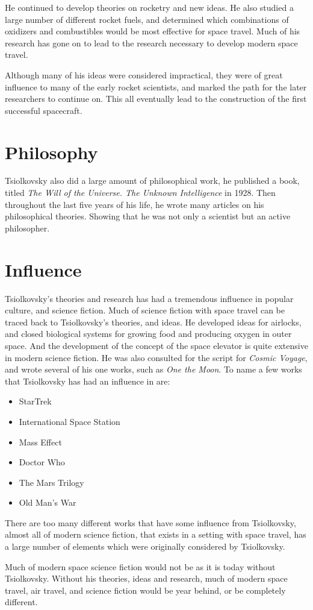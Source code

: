\documentclass[10pt]{armath}
\begin{document}
He continued to develop theories on rocketry and new ideas. He also studied a
large number of different rocket fuels, and determined which combinations of
oxidizers and combustibles would be most effective for space travel. Much of
his research has gone on to lead to the research necessary to develop modern
space travel.

Although many of his ideas were considered impractical, they were of great
influence to many of the early rocket scientists, and marked the path for the
later researchers to continue on. This all eventually lead to the construction
of the first successful spacecraft.

\section{Philosophy}%
\label{sec:philosophy}

Tsiolkovsky also did a large amount of philosophical work, he published a book,
titled \textit{The Will of the Universe. The Unknown Intelligence} in 1928.
Then throughout the last five years of his life, he wrote many articles on his
philosophical theories. Showing that he was not only a scientist but an active
philosopher.

\section{Influence}%
\label{sec:influence}

Tsiolkovsky's theories and research has had a tremendous influence in popular
culture, and science fiction. Much of science fiction with space travel can be
traced back to Tsiolkovsky's theories, and ideas. He developed ideas for
airlocks, and closed biological systems for growing food and producing oxygen
in outer space. And the development of the concept of the space elevator is
quite extensive in modern science fiction. He was also consulted for the script
for \textit{Cosmic Voyage}, and wrote several of his one works, such as
\textit{One the Moon}. To name a few works that Tsiolkovsky has had an
influence in are:
\begin{itemize}
  \item StarTrek
  \item International Space Station
  \item Mass Effect
  \item Doctor Who
  \item The Mars Trilogy
  \item Old Man's War
\end{itemize}
There are too many different works that have some influence from Tsiolkovsky,
almost all of modern science fiction, that exists in a setting with space
travel, has a large number of elements which were originally considered by
Tsiolkovsky.

Much of modern space science fiction would not be as it is today without
Tsiolkovsky. Without his theories, ideas and research, much of modern space
travel, air travel, and science fiction would be year behind, or be completely
different.

\nocite{*}
\printbibliography
\end{document}
